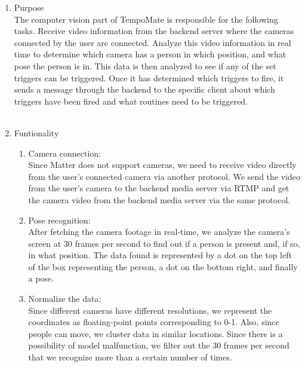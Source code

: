 \begin{enumerate}
      \item Purpose\\
            The computer vision part of TempoMate is responsible for the following tasks. Receive video information from the backend server where the cameras connected by the user are connected. Analyze this video information in real time to determine which camera has a person in which position, and what pose the person is in. This data is then analyzed to see if any of the set triggers can be triggered. Once it has determined which triggers to fire, it sends a message through the backend to the specific client about which triggers have been fired and what routines need to be triggered.\\\\

      \item Funtionality\\
            \begin{enumerate}
                  \item Camera connection:\\
                        Since Matter does not support cameras, we need to receive video directly from the user's connected camera via another protocol. We send the video from the user's camera to the backend media server via RTMP and get the camera video from the backend media server via the same protocol.\\

                  \item Pose recognition:\\
                        After fetching the camera footage in real-time, we analyze the camera's screen at 30 frames per second to find out if a person is present and, if so, in what position. The data found is represented by a dot on the top left of the box representing the person, a dot on the bottom right, and finally a pose.\\

                  \item Normalize the data:\\
                        Since different cameras have different resolutions, we represent the coordinates as floating-point points corresponding to 0-1. Also, since people can move, we cluster data in similar locations. Since there is a possibility of model malfunction, we filter out the 30 frames per second that we recognize more than a certain number of times.\\


\end{enumerate}
\end{enumerate}
